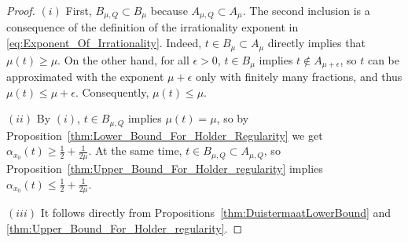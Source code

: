 \documentclass[11pt,reqno]{amsart}
\theoremstyle{definition}
\begin{document}
\begin{proof}
$(i)$ First,  $ B_{\mu,Q} \subset B_\mu$ because $ A_{\mu,Q} \subset A_\mu$. 
The second inclusion is a consequence of the definition of the irrationality exponent in \eqref{eq:Exponent_Of_Irrationality}. 
Indeed, $t \in B_\mu \subset A_\mu$ directly implies that $\mu(t) \geq \mu$. 
On the other hand, for all $\epsilon > 0$, $t \in B_\mu$ implies $t \notin A_{\mu + \epsilon}$, so $t$ can be approximated with the exponent $\mu + \epsilon$ only with finitely many fractions, and thus $\mu(t) \leq \mu + \epsilon$. 
Consequently, $\mu(t) \leq \mu$. 



$(ii)$ By $(i)$, $t \in  B_{\mu,Q}$ implies $\mu(t) = \mu$, so by Proposition~\ref{thm:Lower_Bound_For_Holder_Regularity} we get $\alpha_{x_0} (t) \geq \frac12 + \frac{1}{2\mu}$. 
At the same time,  $t \in B_{\mu,Q} \subset  A_{\mu,Q}$, so Proposition~\ref{thm:Upper_Bound_For_Holder_regularity} implies $\alpha_{x_0}(t) \leq \frac12 + \frac{1}{2\mu}$. 

$(iii)$ It follows directly from Propositions~\ref{thm:DuistermaatLowerBound} and \ref{thm:Upper_Bound_For_Holder_regularity}. 
\end{proof}
\end{document}
